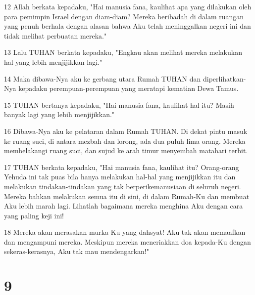 \par 12 Allah berkata kepadaku, "Hai manusia fana, kaulihat apa yang dilakukan oleh para pemimpin Israel dengan diam-diam? Mereka beribadah di dalam ruangan yang penuh berhala dengan alasan bahwa Aku telah meninggalkan negeri ini dan tidak melihat perbuatan mereka."
\par 13 Lalu TUHAN berkata kepadaku, "Engkau akan melihat mereka melakukan hal yang lebih menjijikkan lagi."
\par 14 Maka dibawa-Nya aku ke gerbang utara Rumah TUHAN dan diperlihatkan-Nya kepadaku perempuan-perempuan yang meratapi kematian Dewa Tamus.
\par 15 TUHAN bertanya kepadaku, "Hai manusia fana, kaulihat hal itu? Masih banyak lagi yang lebih menjijikkan."
\par 16 Dibawa-Nya aku ke pelataran dalam Rumah TUHAN. Di dekat pintu masuk ke ruang suci, di antara mezbah dan lorong, ada dua puluh lima orang. Mereka membelakangi ruang suci, dan sujud ke arah timur menyembah matahari terbit.
\par 17 TUHAN berkata kepadaku, "Hai manusia fana, kaulihat itu? Orang-orang Yehuda ini tak puas bila hanya melakukan hal-hal yang menjijikkan itu dan melakukan tindakan-tindakan yang tak berperikemanusiaan di seluruh negeri. Mereka bahkan melakukan semua itu di sini, di dalam Rumah-Ku dan membuat Aku lebih marah lagi. Lihatlah bagaimana mereka menghina Aku dengan cara yang paling keji ini!
\par 18 Mereka akan merasakan murka-Ku yang dahsyat! Aku tak akan memaafkan dan mengampuni mereka. Meskipun mereka meneriakkan doa kepada-Ku dengan sekeras-kerasnya, Aku tak mau mendengarkan!"

\chapter{9}

